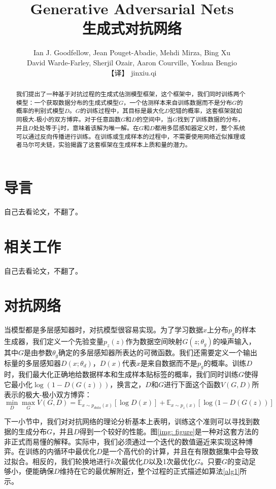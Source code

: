 \documentclass[UTF8]{ctexart}
\title{Generative Adversarial Nets\\生成式对抗网络}
\author{Ian J. Goodfellow,  Jean Pouget-Abadie, Mehdi Mirza, Bing Xu\\ David Warde-Farley, Sherjil Ozair, Aaron Courville, Yoshua Bengio\\【译】 jinxiu.qi}
\begin{document}
\maketitle
\begin{abstract}
我们提出了一种基于对抗过程的生成式估测模型框架，这个框架中，我们同时训练两个模型：一个获取数据分布的生成式模型$G$，一个估测样本来自训练数据而不是分布$G$的概率的判别式模型$D$。$G$的训练过程中，其目标是最大化$D$犯错的概率，这套框架就如同极大-极小的双方博弈。对于任意函数$G$和$D$的空间中，当$G$找到了训练数据的分布，并且$D$处处等于$\frac{1}{2}$时，意味着该解为唯一解。在$G$和$D$都用多层感知器定义时，整个系统可以通过反向传播进行训练。在训练或生成样本的过程中，不需要使用网络近似推理或者马尔可夫链，实验揭露了这套框架在生成样本上质和量的潜力。
\end{abstract}

\section{导言}
自己去看论文，不翻了。
\section{相关工作}
自己去看论文，不翻了。
\section{对抗网络}
当模型都是多层感知器时，对抗模型很容易实现。为了学习数据$x$上分布$p_g$的样本生成器，我们定义一个先验变量$p_z(z)$作为数据空间映射$G(z;\theta_g)$的噪声输入，其中$G$是由参数$\theta_g$确定的多层感知器所表达的可微函数。我们还需要定义一个输出标量的多层感知器$D(x;\theta_d)$，$D(x)$代表$x$是来自数据而不是$p_g$的概率。训练$D$时，我们最大化正确地给数据样本和生成样本贴标签的概率，我们同时训练$G$使得它最小化$\log(1 - D(G(z)))$，换言之，$D$和$G$进行下面这个函数$V(G, D)$所表示的极大-极小双方博弈：
\begin{equation}\label{equ: minmax}
\min\limits_{D}\max\limits_{G}V(G, D) = \mathbb{E}_{x\sim p_{data}(x)}[\log D(x)] + \mathbb{E}_{x\sim p_{z}(x)}[\log(1-D(G(z))]
\end{equation}

下一小节中，我们对对抗网络的理论分析基本上表明，训练这个准则可以寻找到数据的生成分布$G$，并且$D$得到一个较好的性能。图\ref{img: figure}是一种对这套方法的非正式而易懂的解释。实际中，我们必须通过一个迭代的数值逼近来实现这种博弈。在训练的内循环中最优化$D$是一个高代价的计算，并且在有限数据集中会导致过拟合。相反的，我们轮换地进行$k$次最优化$D$以及1次最优化$G$。只要$G$的变动足够小，便能确保$D$维持在它的最优解附近，整个过程的正式描述如算法\ref{alg1}所示。
\end{document}
